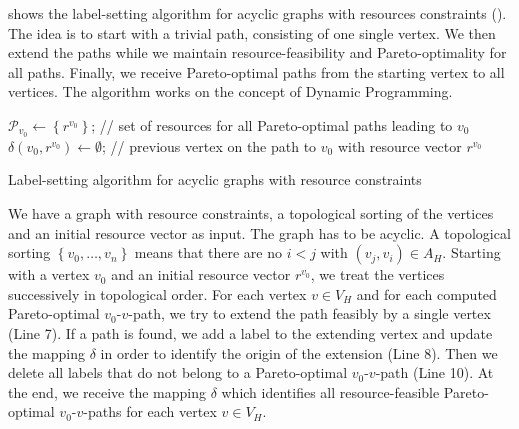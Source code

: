  shows the label-setting algorithm for acyclic graphs with resources constraints (\cite[p.~87]{Kaiser}). The idea is to start with a trivial path, consisting of one single vertex. We then extend the paths while we maintain resource-feasibility and Pareto-optimality for all paths. Finally, we receive Pareto-optimal paths from the starting vertex to all vertices. The algorithm works on the concept of Dynamic Programming.

\begin{algorithm}[hbt]
	\SetAlgoLined
	$\mathcal{P}_{v_0}\gets\left\{r^{v_0}\right\}$; // set of resources for all Pareto-optimal paths leading to $v_0$ \\
	$\delta\left(v_0,r^{v_0}\right)\gets\emptyset$; // previous vertex on the path to $v_0$ with resource vector $r^{v_0}$ \\
	\Return{$\delta$}
	\caption{Label-setting algorithm for acyclic graphs with resource constraints}
	\label{alg:label_setting}
\end{algorithm}

We have a graph with resource constraints, a topological sorting of the vertices and an initial resource vector as input. The graph has to be acyclic. A topological sorting ${\left\{v_0,\dots,v_n\right\}}$ means that there are no $i<j$ with ${\left(v_j,v_i\right)\in A_H}$. Starting with a vertex $v_0$ and an initial resource vector $r^{v_0}$, we treat the vertices successively in topological order. For each vertex $v\in V_H$ and for each computed Pareto-optimal $v_0$-$v$-path, we try to extend the path feasibly by a single vertex (Line 7). If a path is found, we add a label to the extending vertex and update the mapping $\delta$ in order to identify the origin of the extension (Line 8). Then we delete all labels that do not belong to a Pareto-optimal $v_0$-$v$-path (Line 10). At the end, we receive the mapping $\delta$ which identifies all resource-feasible Pareto-optimal $v_0$-$v$-paths for each vertex $v\in V_H$.

